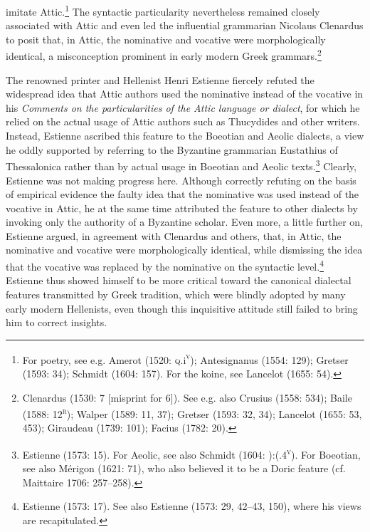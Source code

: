 \documentclass[12pt]{article}
\newenvironment{styleStandard}{\renewcommand\baselinestretch{1.25}\setlength\leftskip{0in}\setlength\rightskip{0in}\setlength\parindent{0.1972in}\setlength\parfillskip{0pt plus 1fil}\setlength\parskip{0in plus 1pt}\writerlistparindent\writerlistleftskip\leavevmode\normalfont\normalsize\writerlistlabel\ignorespaces}{\unskip\vspace{0in plus 1pt}\par}
\newcommand\writerlistleftskip{}
\newcommand\writerlistparindent{}
\newcommand\writerlistlabel{}
\begin{document}
\begin{styleStandard}
imitate Attic.\footnote{ For poetry, see e.g. Amerot (1520: \textsc{q.}i\textsc{\textsuperscript{v}}); Antesignanus (1554: 129); Gretser (1593: 34); Schmidt (1604: 157). For the koine, see Lancelot (1655: 54).} The syntactic particularity nevertheless remained closely associated with Attic and even led the influential grammarian Nicolaus Clenardus to posit that, in Attic, the nominative and vocative were morphologically identical, a misconception prominent in early modern Greek grammars.\footnote{ Clenardus (1530: 7 [misprint for 6]). See e.g. also Crusius (1558: 534); Baile (1588: 12\textsc{\textsuperscript{r}}); Walper (1589: 11, 37); Gretser (1593: 32, 34); Lancelot (1655: 53, 453); Giraudeau (1739: 101); Facius (1782: 20).}
\end{styleStandard}

\begin{styleStandard}
The renowned printer and Hellenist Henri Estienne fiercely refuted the widespread idea that Attic authors used the nominative instead of the vocative in his \textit{Comments on the particularities of the Attic language or dialect}, for which he relied on the actual usage of Attic authors such as Thucydides and other writers. Instead, Estienne ascribed this feature to the Boeotian and Aeolic dialects, a view he oddly supported by referring to the Byzantine grammarian Eustathius of Thessalonica rather than by actual usage in Boeotian and Aeolic texts.\footnote{ Estienne (1573: 15). For Aeolic, see also Schmidt (1604: ):(.4\textsc{\textsuperscript{v}}). For Boeotian, see also Mérigon (1621: 71), who also believed it to be a Doric feature (cf. Maittaire 1706: 257–258).} Clearly, Estienne was not making progress here. Although correctly refuting on the basis of empirical evidence the faulty idea that the nominative was used instead of the vocative in Attic, he at the same time attributed the feature to other dialects by invoking only the authority of a Byzantine scholar. Even more, a little further on, Estienne argued, in agreement with Clenardus and others, that, in Attic, the nominative and vocative were morphologically identical, while dismissing the idea that the vocative was replaced by the nominative on the syntactic level.\footnote{ Estienne (1573: 17). See also Estienne (1573: 29, 42–43, 150), where his views are recapitulated.} Estienne thus showed himself to be more critical toward the canonical dialectal features transmitted by Greek tradition, which were blindly adopted by many early modern Hellenists, even though this inquisitive attitude still failed to bring him to correct insights.
\end{styleStandard}
\end{document}
